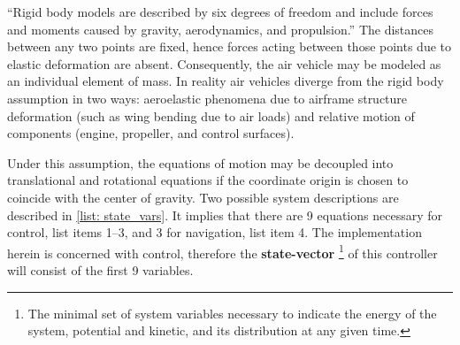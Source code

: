 \documentclass[12pt]{ucthesis}
\begin{document}
\noindent ``Rigid body models are described by six degrees of freedom and include forces and moments caused by gravity, aerodynamics, and propulsion.'' \citep{WL-TR-96-3099} The distances between any two points are fixed, hence forces acting between those points due to elastic deformation are absent. Consequently, the air vehicle may be modeled as an individual element of mass. In reality air vehicles diverge from the rigid body assumption in two ways: aeroelastic phenomena due to airframe structure deformation (such as wing bending due to air loads) and relative motion of components (engine, propeller, and control surfaces).

Under this assumption, the equations of motion may be decoupled into translational and rotational equations if the coordinate origin is chosen to coincide with the center of gravity. Two possible system descriptions are described in \autoref{list: state_vars}. It implies that there are 9 equations necessary for control, list items 1--3, and 3 for navigation, list item 4. The implementation herein is concerned with control, therefore the \textbf{state-vector} \footnote{The minimal set of system variables necessary to indicate the energy of the system, potential and kinetic, and its distribution at any given time.} of this controller will consist of the first 9 variables.
\end{document}
